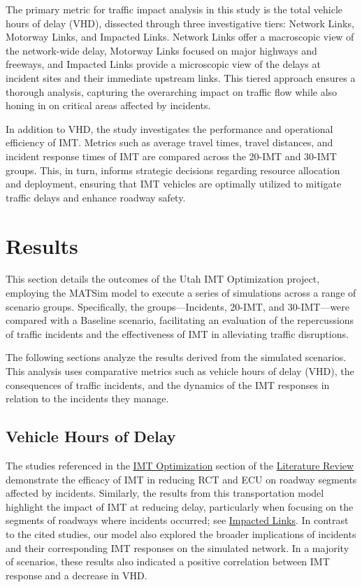 \documentclass[fancy, oneside, mastersfancy, ms]{byuthesis}
\begin{document}
The primary metric for traffic impact analysis in this study is the
total vehicle hours of delay (VHD), dissected through three
investigative tiers: Network Links, Motorway Links, and Impacted Links.
Network Links offer a macroscopic view of the network-wide delay,
Motorway Links focused on major highways and freeways, and Impacted
Links provide a microscopic view of the delays at incident sites and
their immediate upstream links. This tiered approach ensures a thorough
analysis, capturing the overarching impact on traffic flow while also
honing in on critical areas affected by incidents.

In addition to VHD, the study investigates the performance and
operational efficiency of IMT. Metrics such as average travel times,
travel distances, and incident response times of IMT are compared across
the 20-IMT and 30-IMT groups. This, in turn, informs strategic decisions
regarding resource allocation and deployment, ensuring that IMT vehicles
are optimally utilized to mitigate traffic delays and enhance roadway
safety.


\hypertarget{sec-results}{%
\chapter{Results}\label{sec-results}}

This section details the outcomes of the Utah IMT Optimization project,
employing the MATSim model to execute a series of simulations across a
range of scenario groups. Specifically, the groups---Incidents, 20-IMT,
and 30-IMT---were compared with a Baseline scenario, facilitating an
evaluation of the repercussions of traffic incidents and the
effectiveness of IMT in alleviating traffic disruptions.

The following sections analyze the results derived from the simulated
scenarios. This analysis uses comparative metrics such as vehicle hours
of delay (VHD), the consequences of traffic incidents, and the dynamics
of the IMT responses in relation to the incidents they manage.

\hypertarget{vehicle-hours-of-delay}{%
\section{Vehicle Hours of Delay}\label{vehicle-hours-of-delay}}

The studies referenced in the \protect\hyperlink{sec-lit_imt_opt}{IMT
Optimization} section of the
\protect\hyperlink{sec-literature}{Literature Review} demonstrate the
efficacy of IMT in reducing RCT and ECU on roadway segments affected by
incidents. Similarly, the results from this transportation model
highlight the impact of IMT at reducing delay, particularly when
focusing on the segments of roadways where incidents occurred; see
\protect\hyperlink{sec-impacted}{Impacted Links}. In contrast to the
cited studies, our model also explored the broader implications of
incidents and their corresponding IMT responses on the simulated
network. In a majority of scenarios, these results also indicated a
positive correlation between IMT response and a decrease in VHD.
\end{document}
